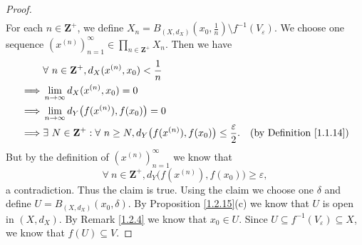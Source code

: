 \begin{proof}
\begin{align*}
    \end{align*}
    For each \(n \in \mathbf{Z}^+\), we define \(X_n = B_{(X, d_X)}(x_0, \frac{1}{n}) \setminus f^{-1}(V_\varepsilon)\).
    We choose one sequence \((x^{(n)})_{n = 1}^\infty \in \prod_{n \in \mathbf{Z}^+} X_n\).
    Then we have
    \begin{align*}
                 & \forall\ n \in \mathbf{Z}^+, d_X(x^{(n)}, x_0) < \frac{1}{n}                                                                                       \\
        \implies & \lim_{n \to \infty} d_X(x^{(n)}, x_0) = 0                                                                                                          \\
        \implies & \lim_{n \to \infty} d_Y\big(f(x^{(n)}), f(x_0)\big) = 0                                                                                            \\
        \implies & \exists\ N \in \mathbf{Z}^+ : \forall\ n \geq N, d_Y\big(f(x^{(n)}), f(x_0)\big) \leq \frac{\varepsilon}{2}. & \text{(by Definition \ref{1.1.14})}
    \end{align*}
    But by the definition of \((x^{(n)})_{n = 1}^\infty\) we know that
    \[
        \forall\ n \in \mathbf{Z}^+, d_Y\big(f(x^{(n)}), f(x_0)\big) \geq \varepsilon,
    \]
    a contradiction.
    Thus the claim is true.
    Using the claim we choose one \(\delta\) and define \(U = B_{(X, d_X)}(x_0, \delta)\).
    By Proposition \ref{1.2.15}(c) we know that \(U\) is open in \((X, d_X)\).
    By Remark \ref{1.2.4} we know that \(x_0 \in U\).
    Since \(U \subseteq f^{-1}(V_\varepsilon) \subseteq X\), we know that \(f(U) \subseteq V\).


\end{proof}

